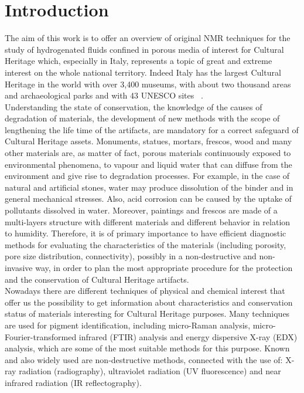 \documentclass[a4paper,11pt]{report}
\begin{document}
\chapter{Introduction}
The aim of this work is to offer an overview of original NMR techniques for the study of hydrogenated fluids confined in porous media of interest for Cultural Heritage which, especially in Italy, represents a topic of great and extreme interest on the whole national territory. Indeed Italy has the largest Cultural Heritage in the world with over 3,400 museums, with about two thousand areas and archaeological parks and with 43 UNESCO sites ~\cite{dieci}.\\ 
Understanding the state of conservation, the knowledge of the causes of degradation of materials, the development of new methods with the scope of lengthening the life time of the artifacts, are mandatory for a correct safeguard of Cultural Heritage assets. Monuments, statues, mortars, frescos, wood and many other materials are, as matter of fact, porous materials continuously exposed to environmental phenomena, to vapour and liquid water that can diffuse from the environment and give rise to degradation processes. For example, in the case of natural and artificial stones, water may produce dissolution of the binder and in general mechanical stresses. Also, acid corrosion can be caused by the uptake of pollutants dissolved in water. Moreover, paintings and frescos are made of a multi-layers structure with different materials and different behavior in relation to humidity. Therefore, it is of primary importance to have efficient diagnostic methods for evaluating the characteristics of the materials (including porosity, pore size distribution, connectivity), possibly in a non-destructive and non-invasive way, in order to plan the most appropriate procedure for the protection and the conservation of Cultural Heritage artifacts\cite{quattro}.\\
Nowadays there are different techniques of physical and chemical interest that offer us the possibility to get information about characteristics and conservation status  of materials interesting for  Cultural Heritage purposes. Many techniques are used for pigment identification, including micro-Raman analysis, micro-Fourier-transformed infrared (FTIR) analysis and energy dispersive X-ray (EDX) analysis, which are some of the most suitable methods for this purpose\cite{sette}. Known and also widely used are non-destructive methods, connected with the use of:  X-ray radiation (radiography), ultraviolet radiation (UV fluorescence) and near infrared radiation (IR reflectography)\cite{otto}.\\
\end{document}
